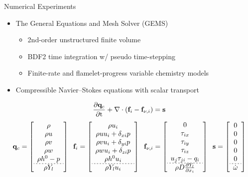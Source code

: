 \documentclass[]{beamer}
\begin{document}
\begin{frame}{Numerical Experiments}
    \begin{itemize}
		\item The General Equations and Mesh Solver (GEMS)\footnotemark[11]
		\begin{itemize}
			\item 2nd-order unstructured finite volume
			\item BDF2 time integration w/ pseudo time-stepping
			\item Finite-rate and flamelet-progress variable chemistry models
		\end{itemize}
		\item Compressible Navier--Stokes equations with scalar transport
	\end{itemize}
	\begin{equation*}
		\frac{\partial \mathbf{q}_c}{\partial \text{t}} + \nabla \cdot (\mathbf{f}_{i} - \mathbf{f}_{\nu,i}) = \mathbf{s}
	\end{equation*}
	\scriptsize
	\def\arraystretch{2}
	\begin{equation*}
		\consVec = \left[
		\begin{array}{c}
		\rho \\ \rho u \\ \rho v \\ \rho w \\ \rho h^0 - p \\ \hdashline[2pt/2pt] \rho Y_{\specIdx} \\
		\end{array}
		\right]  \; \;
		\invFluxDir = \left[
		\begin{array}{c}
		\rho u_i \\  \rho uu_i + \delta_{xi} p \\ \rho vu_i + \delta_{yi} p \\ \rho wu_i + \delta_{zi} p \\ \rho h^0 u_i \\ \hdashline[2pt/2pt] \rho Y_{\specIdx} u_i 
		\end{array}
		\right]  \; \;
		\viscFluxDir = \left[
		\begin{array}{c}
		0 \\ \tau_{ix} \\ \tau_{iy} \\ \tau_{iz} \\ u_j \tau_{ji} - q_i \\ \hdashline[2pt/2pt] \rho D  \pde{Y_{\specIdx}}{x_i}
		\end{array}
		\right]  \; \;
		\mathbf{s} = \left[
		\begin{array}{c}
		0 \\ 0 \\ 0 \\ 0 \\ 0 \\ \hdashline[2pt/2pt] \dot{\omega}
		\end{array} \right]
	\end{equation*}
	\normalsize
\end{frame}
\end{document}
